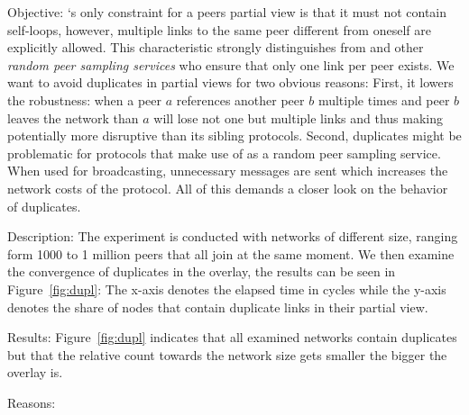 \begin{asparadesc} 
\item[Objective:]
    \SPRAY{}`s only constraint for a peers partial view is that it must not contain
    self-loops, however, multiple links to the same peer different from oneself
    are explicitly allowed.
    This characteristic strongly distinguishes \SPRAY{} from \CYCLON{} and other 
    \emph{random peer sampling services} who ensure that only one link per peer exists.
    We want to avoid duplicates in partial views for two obvious reasons:
    First, it lowers the robustness: when a peer $a$ references another peer $b$ 
    multiple times and peer $b$ leaves the network than $a$ will lose not one but 
    multiple links and thus making \SPRAY{} potentially more disruptive than 
    its sibling protocols.
    Second, duplicates might be problematic for protocols that make use of \SPRAY{} as
    a random peer sampling service. When used for broadcasting, unnecessary messages
    are sent which increases the network costs of the protocol.
    All of this demands a closer look on the behavior of duplicates.
\item[Description:]
    The experiment is conducted with networks of different size, ranging form 1000 
    to 1 million peers that all join at the same moment. We then examine the convergence
    of duplicates in the overlay, the results can be seen in Figure~\ref{fig:dupl}:
    The x-axis denotes the elapsed time in cycles while the y-axis denotes the share of
    nodes that contain duplicate links in their partial view.
\item[Results:]
    Figure~\ref{fig:dupl} indicates that all examined networks contain duplicates but
    that the relative count towards the network size gets smaller the bigger the overlay
    is. 
\item[Reasons:]

\end{asparadesc}


